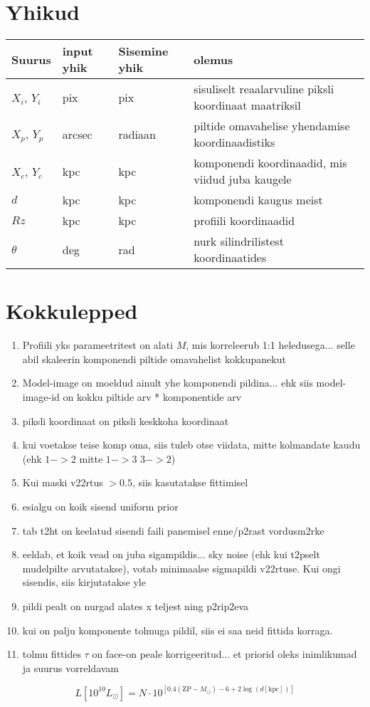 \documentclass{article}
\begin{document}
	\section{Yhikud} %
	\label{sec:yhikud}
	\begin{tabular}{llll}
		Suurus & input yhik & Sisemine yhik & olemus\\
		\hline
		$X_i$, $Y_i$ & pix & pix & sisuliselt reaalarvuline piksli koordinaat maatriksil\\
		$X_p$, $Y_p$ & arcsec & radiaan & piltide omavahelise yhendamise koordinaadistiks\\
		$X_c$, $Y_c$ & kpc & kpc & komponendi koordinaadid, mis viidud juba kaugele\\
		$d$ & kpc & kpc & komponendi kaugus meist\\
		$Rz$ & kpc & kpc & profiili koordinaadid \\
		$\theta$ & deg & rad & nurk silindrilistest koordinaatides\\
	\end{tabular}
	
	
	
	
	\section{Kokkulepped} %
	\label{sec:kokkulepped}
	\begin{enumerate}
		\item Profiili yks parameetritest on alati $M$, mis korreleerub 1:1 heledusega... selle abil skaleerin komponendi piltide omavahelist kokkupanekut
		\item Model-image on moeldud ainult yhe komponendi pildina... ehk siis model-image-id on kokku piltide arv * komponentide arv
		\item piksli koordinaat on piksli keskkoha koordinaat
		\item kui voetakse teise komp oma, siis tuleb otse viidata, mitte kolmandate kaudu (ehk $1->2$ mitte $1->3$ $3->2$)
		\item Kui maski v22rtus $>0.5$, siis kasutatakse fittimisel
		\item esialgu on koik sisend uniform prior
		\item tab t2ht on keelatud sisendi faili panemisel enne/p2rast vordusm2rke
		\item eeldab, et koik vead on juba sigampildis... sky noise (ehk kui t2pselt mudelpilte arvutatakse), votab minimaalse sigmapildi v22rtuse. Kui ongi sisendis, siis kirjutatakse yle
		\item pildi pealt on nurgad alates x teljest ning p2rip2eva
		\item kui on palju komponente tolmuga pildil, siis ei saa neid fittida korraga.
		\item tolmu fittides $\tau$ on face-on peale korrigeeritud... et priorid oleks inimlikumad ja suurus vorreldavam
	\end{enumerate}
	\begin{equation}
		L\left[ 10^{10}L_\odot \right] = N\cdot10^{\left[ 0.4(\mathrm{ZP}-M_\odot) -6 + 2\log(d[\mathrm{kpc}]) \right]}
	\end{equation}
	
\end{document}
